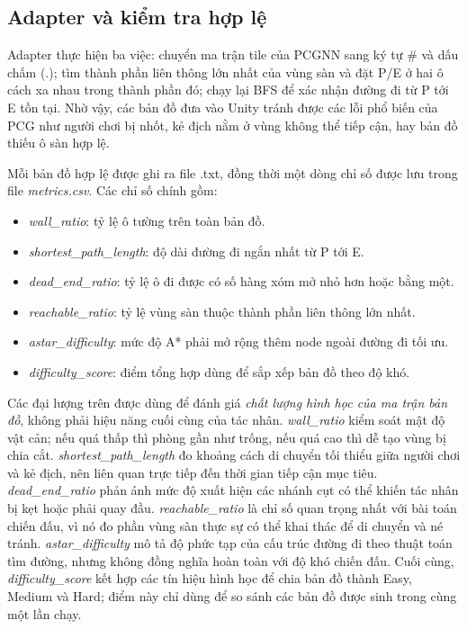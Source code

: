 \subsection{Adapter và kiểm tra hợp lệ}

Adapter thực hiện ba việc: chuyển ma trận tile của PCGNN sang ký tự \# và dấu chấm (.); tìm thành phần liên thông lớn nhất của vùng sàn và đặt P/E ở hai ô cách xa nhau trong thành phần đó; chạy lại BFS để xác nhận đường đi từ P tới E tồn tại. Nhờ vậy, các bản đồ đưa vào Unity tránh được các lỗi phổ biến của PCG như người chơi bị nhốt, kẻ địch nằm ở vùng không thể tiếp cận, hay bản đồ thiếu ô sàn hợp lệ.

Mỗi bản đồ hợp lệ được ghi ra file .txt, đồng thời một dòng chỉ số được lưu trong file \emph{metrics.csv}. Các chỉ số chính gồm:

\begin{itemize}
    \item \emph{wall\_ratio}: tỷ lệ ô tường trên toàn bản đồ.
    \item \emph{shortest\_path\_length}: độ dài đường đi ngắn nhất từ P tới E.
    \item \emph{dead\_end\_ratio}: tỷ lệ ô đi được có số hàng xóm mở nhỏ hơn hoặc bằng một.
    \item \emph{reachable\_ratio}: tỷ lệ vùng sàn thuộc thành phần liên thông lớn nhất.
    \item \emph{astar\_difficulty}: mức độ A* phải mở rộng thêm node ngoài đường đi tối ưu.
    \item \emph{difficulty\_score}: điểm tổng hợp dùng để sắp xếp bản đồ theo độ khó.
\end{itemize}

Các đại lượng trên được dùng để đánh giá \emph{chất lượng hình học của ma trận bản đồ}, không phải hiệu năng cuối cùng của tác nhân. \emph{wall\_ratio} kiểm soát mật độ vật cản; nếu quá thấp thì phòng gần như trống, nếu quá cao thì dễ tạo vùng bị chia cắt. \emph{shortest\_path\_length} đo khoảng cách di chuyển tối thiểu giữa người chơi và kẻ địch, nên liên quan trực tiếp đến thời gian tiếp cận mục tiêu. \emph{dead\_end\_ratio} phản ánh mức độ xuất hiện các nhánh cụt có thể khiến tác nhân bị kẹt hoặc phải quay đầu. \emph{reachable\_ratio} là chỉ số quan trọng nhất với bài toán chiến đấu, vì nó đo phần vùng sàn thực sự có thể khai thác để di chuyển và né tránh. \emph{astar\_difficulty} mô tả độ phức tạp của cấu trúc đường đi theo thuật toán tìm đường, nhưng không đồng nghĩa hoàn toàn với độ khó chiến đấu. Cuối cùng, \emph{difficulty\_score} kết hợp các tín hiệu hình học để chia bản đồ thành Easy, Medium và Hard; điểm này chỉ dùng để so sánh các bản đồ được sinh trong cùng một lần chạy.


